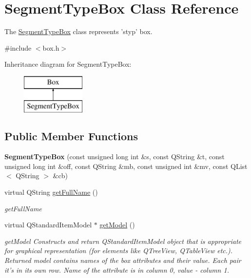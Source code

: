 \hypertarget{class_segment_type_box}{\section{Segment\-Type\-Box Class Reference}
\label{class_segment_type_box}
}


The \hyperlink{class_segment_type_box}{Segment\-Type\-Box} class represents 'styp' box.  




{\ttfamily \#include $<$box.\-h$>$}

Inheritance diagram for Segment\-Type\-Box\-:\begin{figure}[H]
\begin{center}
\leavevmode
\includegraphics[height=2.000000cm]{class_segment_type_box}
\end{center}
\end{figure}
\subsection*{Public Member Functions}
\begin{DoxyCompactItemize}
\item 
\hypertarget{class_segment_type_box_a3aa2f570be54dbe8204b8619238c685d}{{\bfseries Segment\-Type\-Box} (const unsigned long int \&s, const Q\-String \&t, const unsigned long int \&off, const Q\-String \&mb, const unsigned int \&mv, const Q\-List$<$ Q\-String $>$ \&cb)}\label{class_segment_type_box_a3aa2f570be54dbe8204b8619238c685d}

\item 
virtual Q\-String \hyperlink{class_segment_type_box_aba34f8492af563e14e9f904eab862c62}{get\-Full\-Name} ()
\begin{DoxyCompactList}\small\item\em get\-Full\-Name \end{DoxyCompactList}\item 
virtual Q\-Standard\-Item\-Model $\ast$ \hyperlink{class_segment_type_box_a0b2997e05595074bc692d87e1c12a3e1}{get\-Model} ()
\begin{DoxyCompactList}\small\item\em get\-Model Constructs and return Q\-Standard\-Item\-Model object that is appropriate for graphical representation (for elements like Q\-Tree\-View, Q\-Table\-View etc.). Returned model contains names of the box attributes and their value. Each pair it's in its own row. Name of the attribute is in column 0, value -\/ column 1. \end{DoxyCompactList}\end{DoxyCompactItemize}
